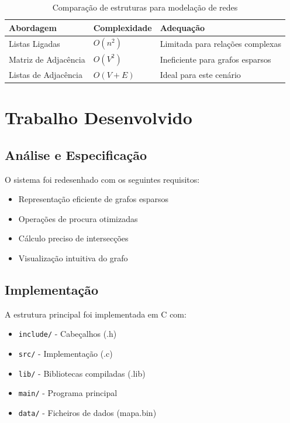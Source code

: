 \documentclass[a4paper,12pt]{report}
\begin{document}
\begin{table}[H]
\centering
\begin{tabular}{lll}
\toprule
\textbf{Abordagem} & \textbf{Complexidade} & \textbf{Adequação} \\
\midrule
Listas Ligadas & \(O(n^2)\) & Limitada para relações complexas \\
Matriz de Adjacência & \(O(V^2)\) & Ineficiente para grafos esparsos \\
Listas de Adjacência & \(O(V+E)\) & Ideal para este cenário \\
\bottomrule
\end{tabular}
\caption{Comparação de estruturas para modelação de redes}
\label{tab:comparativo_grafos}
\end{table}

\chapter{Trabalho Desenvolvido}
\section{Análise e Especificação}
O sistema foi redesenhado com os seguintes requisitos:

\begin{itemize}
    \item Representação eficiente de grafos esparsos
    \item Operações de procura otimizadas
    \item Cálculo preciso de intersecções
    \item Visualização intuitiva do grafo
\end{itemize}

\section{Implementação}
A estrutura principal foi implementada em C com:

\begin{itemize}
    \item \texttt{include/} - Cabeçalhos (.h)
    \item \texttt{src/} - Implementação (.c) 
    \item \texttt{lib/} - Bibliotecas compiladas (.lib)
    \item \texttt{main/} - Programa principal
    \item \texttt{data/} - Ficheiros de dados (mapa.bin)
\end{itemize}
\end{document}
